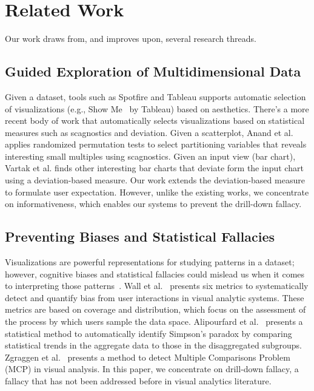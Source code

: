 \section{Related Work}
Our work draws from, and improves upon, several research threads.

\subsection{Guided Exploration of Multidimensional Data}
Given a dataset, tools such as Spotfire and Tableau supports automatic selection of visualizations (e.g., Show Me~\cite{Mackinlay2007} by Tableau) based on aesthetics. There's a more recent body of work that automatically selects visualizations based on statistical measures such as scagnostics and deviation. Given a scatterplot, Anand et al. \cite{Anand2015} applies randomized permutation tests to select partitioning variables that reveals interesting small multiples using scagnostics. Given an input view (bar chart), Vartak et al. \cite{Vartak2015} finds other interesting bar charts that deviate form the input chart using a deviation-based measure. Our work extends the deviation-based measure to formulate user expectation. However, unlike the existing works, we concentrate on informativeness, which enables our systems to prevent the drill-down fallacy.

\subsection{Preventing Biases and Statistical Fallacies}
Visualizations are powerful representations for studying patterns in a dataset; however, cognitive biases and statistical fallacies could mislead us when it comes to interpreting those patterns~\cite{Wall2017, Alipourfard2018WSDM, Zgraggen2018CHI}. Wall et al.~\cite{Wall2017} presents six metrics to systematically detect and quantify bias from user interactions in visual analytic systems. These metrics are based on coverage and distribution, which focus on the assessment of the process by which users sample the data space. Alipourfard et al.~\cite{Alipourfard2018WSDM} presents a statistical method to automatically identify Simpson’s paradox by comparing statistical trends in the aggregate data to those in the disaggregated subgroups. Zgraggen et al.~\cite{Zgraggen2018CHI} presents a method to detect Multiple Comparisons Problem (MCP) in visual analysis. In this paper, we concentrate on drill-down fallacy, a fallacy that has not been addressed before in visual analytics literature.

